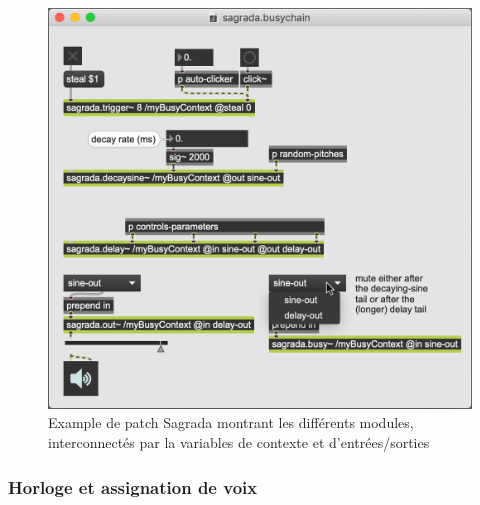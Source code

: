 \begin{figure}[!htbp]
	\captionsetup{format=plain}
	\includegraphics[width=\textwidth]{gfx/04_algorithms/Sagrada-examplePatch.png}
	\caption[Sagrada : exemple de patch]{Example de patch Sagrada montrant les différents modules, interconnectés par la variables de contexte et d'entrées/sorties}
	\label{fig:algorithms:MP-ExamplePatch}
\end{figure}

\subsubsection{Horloge et assignation de voix}

